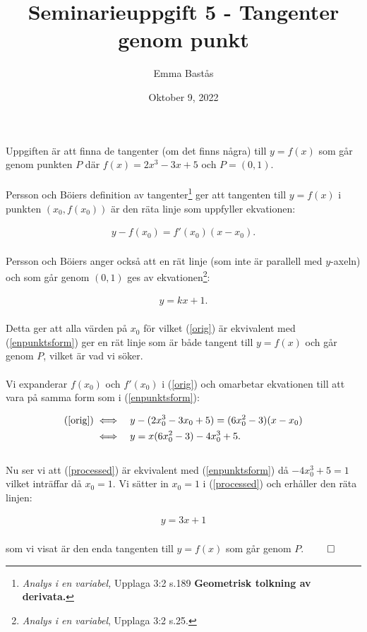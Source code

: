 \documentclass{article}
\title{Seminarieuppgift 5 - Tangenter genom punkt}
\author{Emma Bastås}
\date{Oktober 9, 2022}
\begin{document}
\maketitle

\noindent Uppgiften är att finna de tangenter (om det finns några) till $y = f(x)$ som går genom punkten $P$ där $f(x) = 2x^{3} - 3x + 5$ och $P = (0, 1)$. \\
\\
Persson och Böiers definition av tangenter\footnote{\emph{Analys i en variabel,} Upplaga 3:2 s.189 \textbf{Geometrisk tolkning av derivata.}} ger att tangenten till $y = f(x)$ i punkten $(x_{0}, f(x_{0}))$ är den räta linje som uppfyller ekvationen:

\begin{gather}
  y - f(x_{0}) = f'(x_{0})(x - x_{0})\text{.} \label{orig}
\end{gather}
\\
Persson och Böiers anger också att en rät linje (som inte är parallell med $y$-axeln) och som går genom $(0, 1)$ ges av ekvationen\footnote{\emph{Analys i en variabel}, Upplaga 3:2 s.25.}:

\begin{gather}
  y = kx + 1\text{.} \label{enpunktsform}
\end{gather}
\\
Detta ger att alla värden på $x_{0}$ för vilket (\ref{orig}) är ekvivalent med (\ref{enpunktsform}) ger en rät linje som är både tangent till $y = f(x)$ och går genom $P$, vilket är vad vi söker.
\\
\\
Vi expanderar $f(x_{0})$ och $f'(x_{0})$ i (\ref{orig}) och omarbetar ekvationen till att vara på samma form som i (\ref{enpunktsform}):

\begin{align}
  \text{(\ref{orig})} \iff \quad & y - (2x_{0}^{3} - 3x_{0} + 5) = (6x_{0}^{2} - 3)(x - x_{0}) \nonumber \\
  \iff \quad & y = x(6x_{0}^{2} - 3) - 4x_{0}^{3} + 5\text{.} \label{processed}
\end{align}
\\
Nu ser vi att (\ref{processed}) är ekvivalent med (\ref{enpunktsform}) då $-4x_{0}^{3} + 5 = 1$ vilket inträffar då $x_{0} = 1$. Vi sätter in $x_{0} = 1$ i (\ref{processed}) och erhåller den räta linjen:

\begin{gather*}
  y = 3x + 1 \label{solution}
\end{gather*}
\\
som vi visat är den enda tangenten till $y = f(x)$ som går genom $P$. $\qed$

\thispagestyle{empty}
\end{document}
